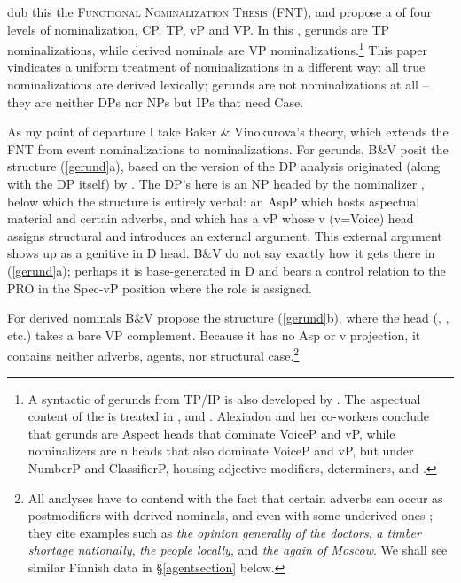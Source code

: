 \documentclass[output=paper,
modfonts
]{LSP/langsci}
\newcommand{\rfa}[2]{(\ref{#1}{#2})}
\def\urf#1{$^{\textrm{\scriptsize{#1}}}$}
\begin{document}
\citet{kornfilt2011} dub this the \textsc{Functional Nominalization Thesis} (FNT), and
propose a  of four levels of nominalization, CP, TP, vP and VP. In this ,
 gerunds are TP nominalizations, while derived nominals are VP
nominalizations.\footnote{A syntactic  of gerunds from TP/IP is also developed by
  \citealt{pires2006}.  The aspectual content of the  is treated in \citealt{pustejovsky1995,alexiadou2001}, and \citealt{alexiadou2010}.  Alexiadou and her co-workers conclude
  that gerunds are  Aspect heads that dominate VoiceP and vP, while nominalizers
  are n heads that also dominate VoiceP and vP, but under NumberP and ClassifierP, housing
  adjective modifiers, determiners, and .} This paper vindicates a uniform treatment of
nominalizations in a different way:  all true nominalizations are derived lexically; gerunds
are not nominalizations at all – they are neither DPs nor NPs but IPs that need Case.

As my point of departure I take Baker \& Vinokurova's \citeyearpar{baker2009} theory, which extends the FNT from
event nominalizations to  nominalizations.  For gerunds, B\&V posit the structure
\rfa{gerund}{a}, based on the version of the DP analysis originated (along with the DP itself) by
\citealt{abney1987}.  The DP's  here is an NP headed by the  nominalizer
\form{-ing\urf{V}}, below which the structure is entirely verbal:  an AspP which hosts
aspectual material and certain adverbs, and which has a vP  whose v (v=Voice) head
assigns structural  and introduces an external  argument. This external  argument
shows up as a genitive in D head. B\&V do not say exactly how it gets there in \rfa{gerund}{a};
perhaps it is base-generated in D and bears a control relation to the PRO in the Spec-vP
position where the  role is assigned.

For derived nominals B\&V propose the structure \rfa{gerund}{b}, where the head
(\form{-ing\urf{N}}, , etc.)  takes a bare VP complement. Because it has no Asp
or v projection, it contains neither adverbs, agents, nor structural case.\footnote{All
  analyses have to contend with the fact that certain adverbs can occur as postmodifiers with
  derived nominals, and even with some underived ones \citep{payne2010}; they
  cite examples such as \textit{the opinion generally of the doctors}, \textit{a timber
    shortage nationally}, \textit{the people locally}, and \textit{the  again of
    Moscow}.  We shall see similar Finnish data in \S\ref{agentsection} below.}
\end{document}
